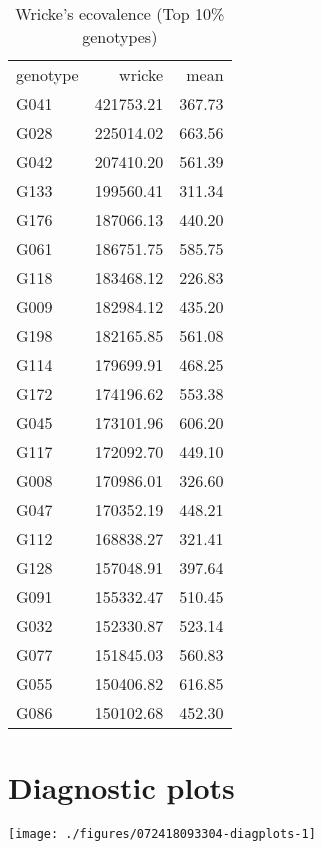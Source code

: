 \documentclass[a4paper,11pt]{article}\usepackage[]{graphicx}\usepackage[]{color}
\makeatletter
\def\maxwidth{ %
  \ifdim\Gin@nat@width>\linewidth
    \linewidth
  \else
    \Gin@nat@width
  \fi
}
\newenvironment{knitrout}{}{} %
\makeatother
\begin{document}
\begin{table}[ht]
\begin{flushleft}
\caption{Wricke's ecovalence (Top 10\% genotypes)} 
\label{wricke}
\begin{tabular}{lrr}
 genotype & wricke & mean \\ 
 G041 & 421753.21 & 367.73 \\ 
  G028 & 225014.02 & 663.56 \\ 
  G042 & 207410.20 & 561.39 \\ 
  G133 & 199560.41 & 311.34 \\ 
  G176 & 187066.13 & 440.20 \\ 
  G061 & 186751.75 & 585.75 \\ 
  G118 & 183468.12 & 226.83 \\ 
  G009 & 182984.12 & 435.20 \\ 
  G198 & 182165.85 & 561.08 \\ 
  G114 & 179699.91 & 468.25 \\ 
  G172 & 174196.62 & 553.38 \\ 
  G045 & 173101.96 & 606.20 \\ 
  G117 & 172092.70 & 449.10 \\ 
  G008 & 170986.01 & 326.60 \\ 
  G047 & 170352.19 & 448.21 \\ 
  G112 & 168838.27 & 321.41 \\ 
  G128 & 157048.91 & 397.64 \\ 
  G091 & 155332.47 & 510.45 \\ 
  G032 & 152330.87 & 523.14 \\ 
  G077 & 151845.03 & 560.83 \\ 
  G055 & 150406.82 & 616.85 \\ 
  G086 & 150102.68 & 452.30 \\ 
  \end{tabular}
\end{flushleft}
\end{table}


\clearpage
\section{Diagnostic plots}
\begin{knitrout}
\color{fgcolor}

\texttt{[image: ./figures/072418093304-diagplots-1]} \hfill{}



\end{knitrout}

\end{document}
